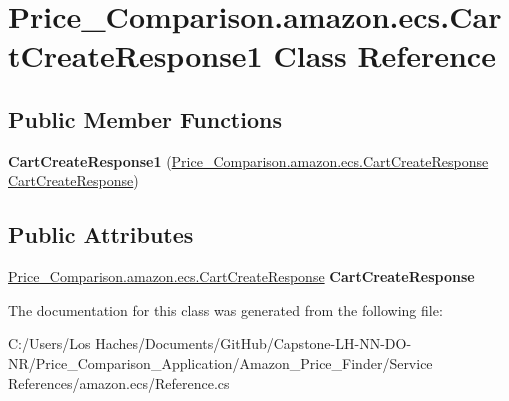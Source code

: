 \hypertarget{class_price___comparison_1_1amazon_1_1ecs_1_1_cart_create_response1}{\section{Price\-\_\-\-Comparison.\-amazon.\-ecs.\-Cart\-Create\-Response1 Class Reference}
\label{class_price___comparison_1_1amazon_1_1ecs_1_1_cart_create_response1}
}
\subsection*{Public Member Functions}
\begin{DoxyCompactItemize}
\item 
\hypertarget{class_price___comparison_1_1amazon_1_1ecs_1_1_cart_create_response1_ab1680303ff8593151750f46e1db3188b}{{\bfseries Cart\-Create\-Response1} (\hyperlink{class_price___comparison_1_1amazon_1_1ecs_1_1_cart_create_response}{Price\-\_\-\-Comparison.\-amazon.\-ecs.\-Cart\-Create\-Response} \hyperlink{class_price___comparison_1_1amazon_1_1ecs_1_1_cart_create_response}{Cart\-Create\-Response})}\label{class_price___comparison_1_1amazon_1_1ecs_1_1_cart_create_response1_ab1680303ff8593151750f46e1db3188b}

\end{DoxyCompactItemize}
\subsection*{Public Attributes}
\begin{DoxyCompactItemize}
\item 
\hypertarget{class_price___comparison_1_1amazon_1_1ecs_1_1_cart_create_response1_ab0b78174fcac8fb87d5fc329e05429e1}{\hyperlink{class_price___comparison_1_1amazon_1_1ecs_1_1_cart_create_response}{Price\-\_\-\-Comparison.\-amazon.\-ecs.\-Cart\-Create\-Response} {\bfseries Cart\-Create\-Response}}\label{class_price___comparison_1_1amazon_1_1ecs_1_1_cart_create_response1_ab0b78174fcac8fb87d5fc329e05429e1}

\end{DoxyCompactItemize}


The documentation for this class was generated from the following file\-:\begin{DoxyCompactItemize}
\item 
C\-:/\-Users/\-Los Haches/\-Documents/\-Git\-Hub/\-Capstone-\/\-L\-H-\/\-N\-N-\/\-D\-O-\/\-N\-R/\-Price\-\_\-\-Comparison\-\_\-\-Application/\-Amazon\-\_\-\-Price\-\_\-\-Finder/\-Service References/amazon.\-ecs/Reference.\-cs\end{DoxyCompactItemize}
